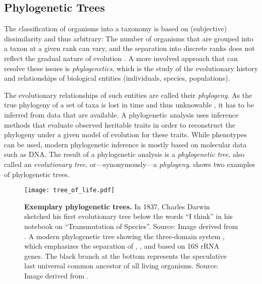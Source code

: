 \subsection{Phylogenetic Trees}
\label{ch:Foundations:sec:TreeOfLife:sub:PhylogeneticTrees}

The classification of organisms into a taxonomy is based on (subjective) dissimilarity and thus arbitrary:
The number of organisms that are grouped into a taxon at a given rank can vary,
and the separation into discrete ranks does not reflect the gradual nature of evolution \cite{Gingerich1987}.
A more involved approach that can resolve these issues is \emph{phylogenetics},
which is the study of the evolutionary history and relationships of biological entities (individuals, species, populations).

The evolutionary relationships of such entities are called their \emph{phylogeny}.
As the true phylogeny of a set of taxa is lost in time and thus unknowable \cite{Haber2005},
it has to be inferred from data that are available.
A phylogenetic analysis uses inference methods that evaluate observed heritable traits
in order to reconstruct the phylogeny under a given model of evolution for these traits.
While phenotypes can be used, modern phylogenetic inference is mostly based on molecular data such as DNA.
The result of a phylogenetic analysis is a \emph{phylogenetic tree},
also called an \emph{evolutionary tree}, or---synonymously---a \emph{phylogeny}.
 shows two examples of phylogenetic trees.

\begin{figure}[hpbt]
    \centering
    \texttt{[image: tree\_of\_life.pdf]}
    \begin{subfigure}{0pt}
        \label{fig:tree_of_life:sub:darwin}
    \end{subfigure}
    \begin{subfigure}{0pt}
        \label{fig:tree_of_life:sub:woese}
    \end{subfigure}
    \caption[Exemplary phylogenetic trees]{
        \textbf{Exemplary phylogenetic trees.}
        In 1837, Charles Darwin sketched his first evolutionary tree below the words ``I think''
        in his notebook on ``Transmutation of Species''.
        Source: Image derived from \cite{DarwinTreeOfLife1837}.
        A modern phylogenetic tree showing the three-domain system \cite{Woese1977,Woese1990},
        which emphasizes the separation of , , and 
        based on 16S rRNA genes.
        The black branch at the bottom represents the speculative last universal common ancestor of all living organisms.
        Source: Image derived from \cite{WoeseTreeOfLife2006}.
    }
    \label{fig:tree_of_life}
\end{figure}

